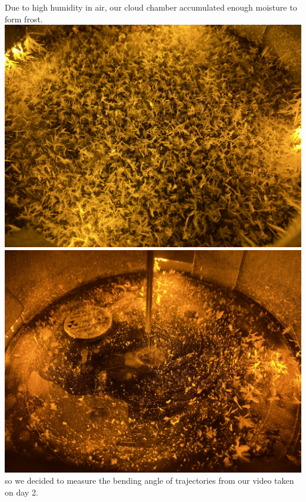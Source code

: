 \documentclass[a4paper]{tufte-handout}
\begin{document}
Due to high humidity in air, our cloud chamber accumulated enough moisture to form frost.
\\
\includegraphics[width = 1 \textwidth]{figures/day3_frost.JPG}
\\
\includegraphics[width = 1 \textwidth]{figures/day3_frost_gamma.JPG}
\\
so we decided to measure the bending angle of trajectories from our video taken on day 2.
\\
\end{document}
